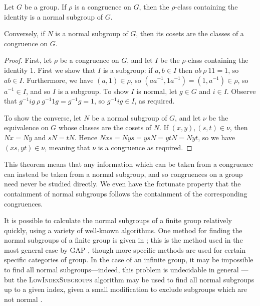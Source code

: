 \begin{theorem}
  \label{thm:normal-subgroups}
  Let $G$ be a group.  If $\rho$ is a congruence on $G$, then the $\rho$-class
  containing the identity is a normal subgroup of $G$.

  Conversely, if $N$ is a normal subgroup of $G$, then its cosets are the
  classes of a congruence on $G$.

  \begin{proof}
    First, let $\rho$ be a congruence on $G$, and let $I$ be the $\rho$-class
    containing the identity $1$.  First we show that $I$ is a subgroup: if
    $a,b \in I$ then $ab ~\rho~ 11 = 1$, so $ab \in I$.
    Furthermore, we have $(a,1) \in \rho$, so
    $(aa^{-1}, 1a^{-1}) = (1, a^{-1}) \in \rho$, so $a^{-1} \in I$, and so
    $I$ is a subgroup.  To show $I$ is normal, let $g \in G$ and $i \in I$.
    Observe that $g^{-1}ig ~\rho~ g^{-1}1g = g^{-1}g = 1$, so $g^{-1}ig \in I$,
    as required.

    To show the converse, let $N$ be a normal subgroup of $G$, and let $\nu$ be
    the equivalence on $G$ whose classes are the cosets of $N$.  If
    $(x,y), (s,t) \in \nu$, then $Nx=Ny$ and $sN=tN$.  Hence
    $Nxs=Nys=ysN=ytN=Nyt$, so we have $(xs,yt) \in \nu$, meaning that $\nu$ is
    a congruence as required.
  \end{proof}
\end{theorem}

This theorem means that any information which can be taken from a congruence can
instead be taken from a normal subgroup, and so congruences on a group need
never be studied directly.  We even have the fortunate property that the
containment of normal subgroups follows the containment of the corresponding
congruences.

It is possible to calculate the normal subgroups of a finite group relatively
quickly, using a variety of well-known algorithms.  One method for finding the
normal subgroups of a finite group is given in \cite{hulpke_1998}; this is the
method used in the most general case by GAP \cite{gap}, though more specific
methods are used for certain specific categories of group.  In the case of an
infinite group, it may be impossible to find all normal subgroups---indeed, this
problem is undecidable in general \cite[Theorem 3.17]{miller_1992}---but the
\textsc{LowIndexSubgroups} algorithm \cite[\S 5.4]{cgt} may be used to find all
normal subgroups up to a given index, given a small modification to exclude
subgroups which are not normal \cite[\S 5.5]{cgt}.

